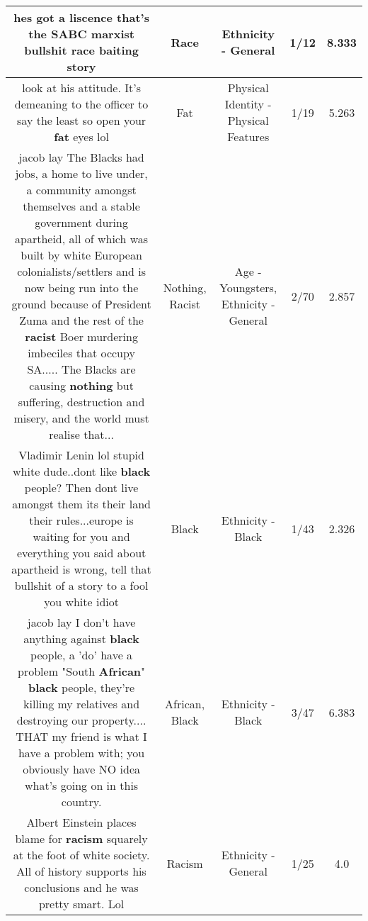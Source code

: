 \documentclass[11pt]{article}
\newlength\mylength
\begin{document}
\begin{center}
\begin{longtable}{|C{.65\mylength}|C{.30\mylength}|C{.12\mylength}|C{.12\mylength}|C{.12\mylength}|}
  \small hes got a liscence that's the SABC marxist bullshit \textbf{race} baiting story\normalsize   & Race & Ethnicity - General & 1/12 & 8.333 \\  \hline
  \small look at his attitude. It's demeaning to the officer to say the least so open your \textbf{fat} eyes lol\normalsize   & Fat & Physical Identity - Physical Features & 1/19 & 5.263 \\  \hline
  \small jacob lay The Blacks had jobs, a home to live under, a community amongst themselves and a stable government during apartheid, all of which was built by white European colonialists/settlers and is now being run into the ground because of President Zuma and the rest of the \textbf{racist} Boer murdering imbeciles that occupy SA..... The Blacks are causing \textbf{nothing} but suffering, destruction and misery, and the world must realise that...\normalsize   & Nothing, Racist & Age - Youngsters, Ethnicity - General & 2/70 & 2.857 \\  \hline
  \small Vladimir Lenin lol stupid white dude..dont like \textbf{black} people? Then dont live amongst them its their land their rules...europe is waiting for you and everything you said about apartheid is wrong,  tell that bullshit of a story to a fool you white idiot\normalsize   & Black & Ethnicity - Black & 1/43 & 2.326 \\  \hline
  \small jacob lay I don't have anything against \textbf{black} people, a  'do' have a problem "South \textbf{African}" \textbf{black} people, they're killing my relatives and destroying our property.... THAT my friend is what I have a problem with; you obviously have NO idea what's going on in this country.\normalsize   & African, Black & Ethnicity - Black & 3/47 & 6.383 \\  \hline
  \small Albert Einstein places blame for \textbf{racism} squarely at the foot of white society. All of history supports his conclusions and he was pretty smart. Lol\normalsize   & Racism & Ethnicity - General & 1/25 & 4.0 \\  \hline

\end{longtable}
\end{center}
\end{document}
